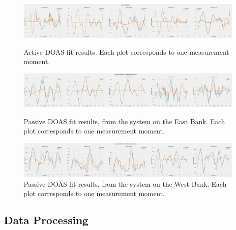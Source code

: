 \begin{figure}
    \centering
    \includegraphics[width=\textheight]{img/eps/fit_active.eps}
    \caption{Active \gls{DOAS} fit results. Each plot corresponds to one
    measurement moment.}
    \label{fig:fit_active}
    \includegraphics[width=\textheight]{img/eps/fit_passive_back.eps}
    \caption{Passive \gls{DOAS} fit results, from the system on the East
    Bank. Each plot corresponds to one measurement moment.}
    \includegraphics[width=\textheight]{img/eps/fit_passive_front.eps}
    \caption{Passive \gls{DOAS} fit results, from the system on the West
    Bank. Each plot corresponds to one measurement moment.}
\end{figure}




\subsection{Data Processing}%
\label{sub:data_processing}

